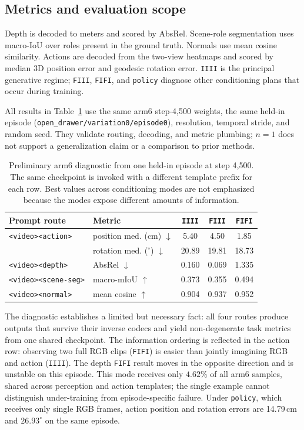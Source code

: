 \documentclass{article}
\newcommand{\code}[1]{\texttt{#1}}
\newcommand{\ptag}[1]{\texttt{<#1>}}
\newcommand{\tabref}[1]{Table~\ref{#1}}
\begin{document}
\subsection{Metrics and evaluation scope}

Depth is decoded to meters and scored by AbsRel. Scene-role segmentation uses macro-IoU over
roles present in the ground truth. Normals use mean cosine similarity. Actions are decoded from
the two-view heatmaps and scored by median 3D position error and geodesic rotation error.
\code{IIII} is the principal generative regime; \code{FIII}, \code{FIFI}, and \code{policy}
diagnose other conditioning plans that occur during training.

All results in \tabref{tab:diagnostic} use the same arm6 step-4,500 weights, the same held-in
episode (\code{open\_drawer/variation0/episode0}), resolution, temporal stride, and random seed.
They validate routing, decoding, and metric plumbing; $n=1$ does not support a generalization
claim or a comparison to prior methods.

\begin{table}[t]
\caption{Preliminary arm6 diagnostic from one held-in episode at step 4,500. The same checkpoint
is invoked with a different template prefix for each row. Best values across conditioning modes
are not emphasized because the modes expose different amounts of information.}
\label{tab:diagnostic}
\centering
\small
\begin{tabular}{llccc}
\toprule
\textbf{Prompt route} & \textbf{Metric} & \code{IIII} & \code{FIII} & \code{FIFI} \\
\midrule
\ptag{video}\ptag{action} & position med. (cm) $\downarrow$ & 5.40 & 4.50 & 1.85 \\
                           & rotation med. ($^\circ$) $\downarrow$ & 20.89 & 19.81 & 18.73 \\
\ptag{video}\ptag{depth} & AbsRel $\downarrow$ & 0.160 & 0.069 & 1.335 \\
\ptag{video}\ptag{scene-seg} & macro-mIoU $\uparrow$ & 0.373 & 0.355 & 0.494 \\
\ptag{video}\ptag{normal} & mean cosine $\uparrow$ & 0.904 & 0.937 & 0.952 \\
\bottomrule
\end{tabular}
\end{table}

The diagnostic establishes a limited but necessary fact: all four routes produce outputs that
survive their inverse codecs and yield non-degenerate task metrics from one shared checkpoint.
The information ordering is reflected in the action row: observing two full RGB clips
(\code{FIFI}) is easier than jointly imagining RGB and action (\code{IIII}). The depth
\code{FIFI} result moves in the opposite direction and is unstable on this episode. This mode
receives only $4.62\%$ of all arm6 samples, shared across perception and action templates; the
single example cannot distinguish under-training from episode-specific failure. Under
\code{policy}, which receives only single RGB frames, action position and rotation errors are
14.79\,cm and $26.93^\circ$ on the same episode.
\end{document}
